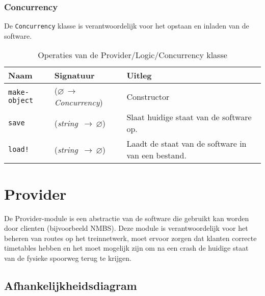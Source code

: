 \documentclass[a4paper, 11pt]{article}
\newcommand{\naar}{\,$\rightarrow$\,}
\renewcommand{\empty}{$\varnothing$}
\newcommand{\<}{\scriptsize\textless\normalsize}
\renewcommand{\>}{\scriptsize\textgreater\normalsize}
\begin{document}
\subsubsection{Concurrency} %
De \texttt{Concurrency} klasse is verantwoordelijk voor het opstaan en inladen van de software.
\begin{table}[H]
	\begin{center}
		{
		\begin{tabular}{|l l l|}
			\hline
			\textbf{Naam} & \textbf{Signatuur} & \textbf{Uitleg}\\
			\hline
			\texttt{make-object} & (\empty \naar \textit{Concurrency}) & Constructor\\
			\hline
			\texttt{save} & (\textit{string} \naar \empty) & Slaat huidige staat van de software op.\\
			\texttt{load!} & (\textit{string} \naar \empty) & Laadt de staat van de software in van een bestand.\\
			\hline
		\end{tabular}}
		\caption{Operaties van de Provider/Logic/Concurrency klasse}
	\end{center}
\end{table}

\newpage

\section{Provider} %
De Provider-module is een abstractie van de software die gebruikt kan worden door clienten (bijvoorbeeld NMBS). Deze module is verantwoordelijk voor het beheren van routes op het treinnetwerk, moet ervoor zorgen dat klanten correcte timetables hebben en het moet mogelijk zijn om na een crash de huidige staat van de fysieke spoorweg terug te krijgen.

\subsection{Afhankelijkheidsdiagram} %
\begin{center}
\end{center}
\end{document}
